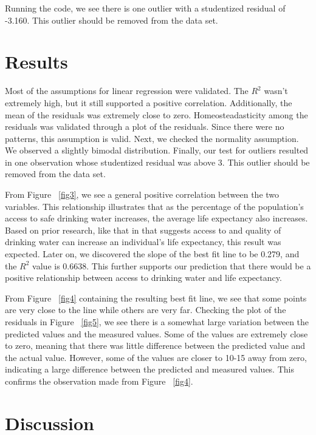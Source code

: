 \documentclass[12pt]{article}
\begin{document}
Running the code, we see there is one outlier with a studentized residual of -3.160. This outlier should be removed from the data set.

\section{Results}

Most of the assumptions for linear regression were validated. The $R^2$ wasn't extremely high, but it still supported a positive correlation. Additionally, the mean of the residuals was extremely close to zero. Homeosteadasticity among the residuals was validated through a plot of the residuals. Since there were no patterns, this assumption is valid. Next, we checked the normality assumption. We observed a slightly bimodal distribution. Finally, our test for outliers resulted in one observation whose studentized residual was above 3. This outlier should be removed from the data set.

From Figure ~\ref{fig3}, we see a general positive correlation between the two variables. This relationship illustrates that as the percentage of the population's access to safe drinking water increases, the average life expectancy also increases. Based on prior research, like that in \citet{angelakis2021quality} that suggests access to and quality of drinking water can increase an individual's life expectancy, this result was expected. Later on, we discovered the slope of the best fit line to be 0.279, and the $R^2$ value is 0.6638. This further supports our prediction that there would be a positive relationship between access to drinking water and life expectancy.

From Figure ~\ref{fig4} containing the resulting best fit line, we see that some points are very close to the line while others are very far. Checking the plot of the residuals in Figure ~\ref{fig5}, we see there is a somewhat large variation between the predicted values and the measured values. Some of the values are extremely close to zero, meaning that there was little difference between the predicted value and the actual value. However, some of the values are closer to 10-15 away from zero, indicating a large difference between the predicted and measured values. This confirms the observation made from Figure ~\ref{fig4}.

\section{Discussion}
\end{document}
